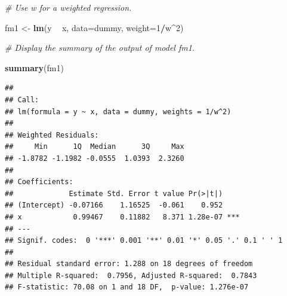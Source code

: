 \documentclass[]{book}
\newenvironment{Shaded}{\begin{snugshade}}{\end{snugshade}}
\newcommand{\CommentTok}[1]{\textcolor[rgb]{0.56,0.35,0.01}{\textit{#1}}}
\newcommand{\DataTypeTok}[1]{\textcolor[rgb]{0.13,0.29,0.53}{#1}}
\newcommand{\DecValTok}[1]{\textcolor[rgb]{0.00,0.00,0.81}{#1}}
\newcommand{\KeywordTok}[1]{\textcolor[rgb]{0.13,0.29,0.53}{\textbf{#1}}}
\newcommand{\NormalTok}[1]{#1}
\newcommand{\OperatorTok}[1]{\textcolor[rgb]{0.81,0.36,0.00}{\textbf{#1}}}
\newcommand{\StringTok}[1]{\textcolor[rgb]{0.31,0.60,0.02}{#1}}
\begin{document}
\begin{Shaded}
\begin{Highlighting}[]
\CommentTok{# Use w for a weighted regression.}

\NormalTok{fm1 <-}\StringTok{ }\KeywordTok{lm}\NormalTok{(y }\OperatorTok{~}\StringTok{ }\NormalTok{x, }\DataTypeTok{data=}\NormalTok{dummy, }\DataTypeTok{weight=}\DecValTok{1}\OperatorTok{/}\NormalTok{w}\OperatorTok{^}\DecValTok{2}\NormalTok{) }

\CommentTok{# Display the summary of the output of model fm1.}

\KeywordTok{summary}\NormalTok{(fm1)}
\end{Highlighting}
\end{Shaded}

\begin{verbatim}
## 
## Call:
## lm(formula = y ~ x, data = dummy, weights = 1/w^2)
## 
## Weighted Residuals:
##     Min      1Q  Median      3Q     Max 
## -1.8782 -1.1982 -0.0555  1.0393  2.3260 
## 
## Coefficients:
##             Estimate Std. Error t value Pr(>|t|)    
## (Intercept) -0.07166    1.16525  -0.061    0.952    
## x            0.99467    0.11882   8.371 1.28e-07 ***
## ---
## Signif. codes:  0 '***' 0.001 '**' 0.01 '*' 0.05 '.' 0.1 ' ' 1
## 
## Residual standard error: 1.288 on 18 degrees of freedom
## Multiple R-squared:  0.7956, Adjusted R-squared:  0.7843 
## F-statistic: 70.08 on 1 and 18 DF,  p-value: 1.276e-07
\end{verbatim}

\begin{Shaded}
\end{Shaded}
\end{document}
